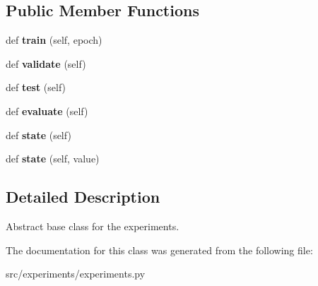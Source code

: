 \subsection*{Public Member Functions}
\begin{DoxyCompactItemize}
\item 
def {\bfseries train} (self, epoch)\hypertarget{classexperiments_1_1Experiment_acc2a8ad8030038ea2d891099edd286f5}{}\label{classexperiments_1_1Experiment_acc2a8ad8030038ea2d891099edd286f5}

\item 
def {\bfseries validate} (self)\hypertarget{classexperiments_1_1Experiment_ab652dc0daa8b93841258060f6c8f9376}{}\label{classexperiments_1_1Experiment_ab652dc0daa8b93841258060f6c8f9376}

\item 
def {\bfseries test} (self)\hypertarget{classexperiments_1_1Experiment_aa21f617378a3b6648db5bf9ee407babf}{}\label{classexperiments_1_1Experiment_aa21f617378a3b6648db5bf9ee407babf}

\item 
def {\bfseries evaluate} (self)\hypertarget{classexperiments_1_1Experiment_a2eb3e3401304334fc2ee5a198b5da7b7}{}\label{classexperiments_1_1Experiment_a2eb3e3401304334fc2ee5a198b5da7b7}

\item 
def {\bfseries state} (self)\hypertarget{classexperiments_1_1Experiment_a911083453a831d45a0e9938de2f0e8b7}{}\label{classexperiments_1_1Experiment_a911083453a831d45a0e9938de2f0e8b7}

\item 
def {\bfseries state} (self, value)\hypertarget{classexperiments_1_1Experiment_ac4abf41c48de38c2485a60307bdde0e3}{}\label{classexperiments_1_1Experiment_ac4abf41c48de38c2485a60307bdde0e3}

\end{DoxyCompactItemize}


\subsection{Detailed Description}
\begin{DoxyVerb}Abstract base class for the experiments.
\end{DoxyVerb}
 

The documentation for this class was generated from the following file\+:\begin{DoxyCompactItemize}
\item 
src/experiments/experiments.\+py\end{DoxyCompactItemize}
